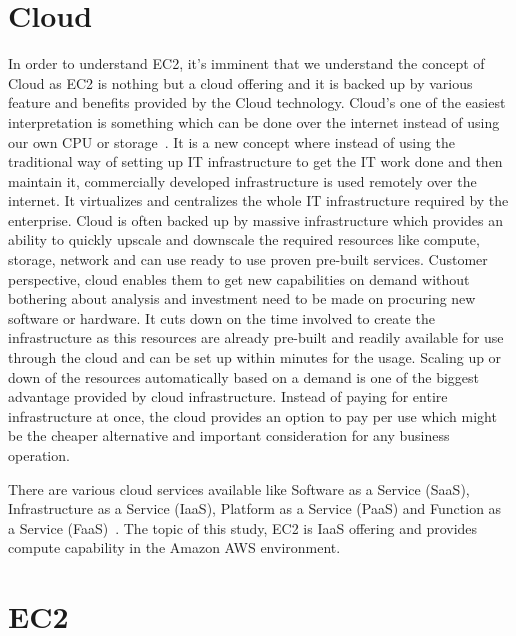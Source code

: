 \section{Cloud}

In order to understand EC2, it's imminent that we understand the
concept of Cloud as EC2 is nothing but a cloud offering and it is
backed up by various feature and benefits provided by the Cloud
technology. Cloud's one of the easiest interpretation is something
which can be done over the internet instead of using our own CPU or
storage~\cite{hid-sp18-402-www-infoworld}. It is a new concept where
instead of using the traditional way of setting up IT infrastructure
to get the IT work done and then maintain it, commercially developed
infrastructure is used remotely over the internet. It virtualizes and
centralizes the whole IT infrastructure required by the
enterprise. Cloud is often backed up by massive infrastructure which
provides an ability to quickly upscale and downscale the required
resources like compute, storage, network and can use ready to use
proven pre-built services. Customer perspective, cloud enables them to
get new capabilities on demand without bothering about analysis and
investment need to be made on procuring new software or hardware. It
cuts down on the time involved to create the infrastructure as this
resources are already pre-built and readily available for use through
the cloud and can be set up within minutes for the usage. Scaling up
or down of the resources automatically based on a demand is one of the
biggest advantage provided by cloud infrastructure. Instead of paying
for entire infrastructure at once, the cloud provides an option to pay
per use which might be the cheaper alternative and important
consideration for any business operation.

There are various cloud services available like Software as a Service
(SaaS), Infrastructure as a Service (IaaS), Platform as a Service
(PaaS) and Function as a Service
(FaaS)~\cite{hid-sp18-402-www-infoworld}. The topic of this study, EC2
is IaaS offering and provides compute capability in the Amazon AWS
environment.

\section{EC2}

